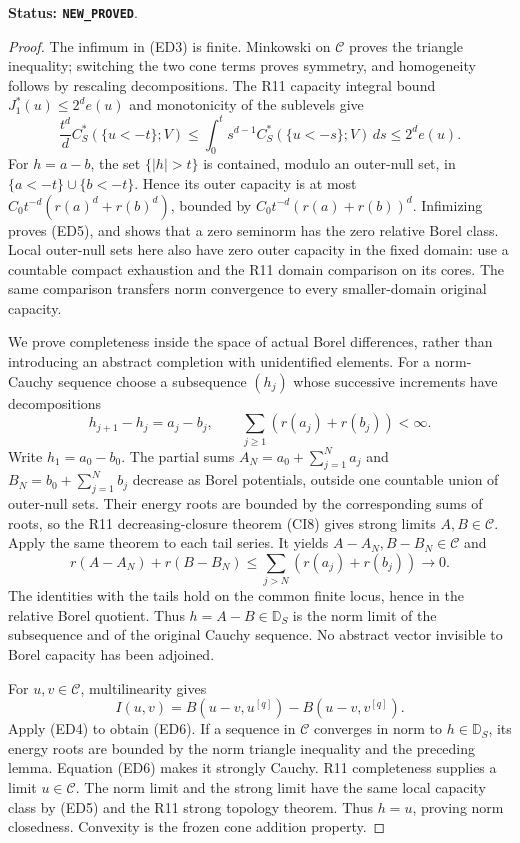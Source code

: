 \noindent\textbf{Status: \texttt{NEW\_PROVED}}.

\begin{proof}
The infimum in (ED3) is finite. Minkowski on $\mathscr C$ proves
the triangle inequality; switching the two cone terms proves
symmetry, and homogeneity follows by rescaling decompositions.
The R11 capacity integral bound $J_1^*(u)\leq2^d e(u)$ and
monotonicity of the sublevels give
\[
 \frac{t^d}{d}C_S^*(\{u<-t\};V)
       \leq\int_0^t s^{d-1}C_S^*(\{u<-s\};V)\,ds
       \leq2^d e(u).
\]
For $h=a-b$, the set $\{|h|>t\}$ is contained, modulo an
outer-null set, in $\{a<-t\}\cup\{b<-t\}$. Hence its outer
capacity is at most $C_0t^{-d}(r(a)^d+r(b)^d)$, bounded by
$C_0t^{-d}(r(a)+r(b))^d$. Infimizing proves (ED5), and shows
that a zero seminorm has the zero relative Borel class. Local
outer-null sets here also have zero outer capacity in the fixed
domain: use a countable compact exhaustion and the R11 domain
comparison on its cores. The same comparison transfers norm
convergence to every smaller-domain original capacity.

We prove completeness inside the space of actual Borel differences,
rather than introducing an abstract completion with unidentified
elements. For a norm-Cauchy sequence choose a subsequence $(h_j)$
whose successive increments have decompositions
\[
 h_{j+1}-h_j=a_j-b_j,\qquad
 \sum_{j\geq1}(r(a_j)+r(b_j))<\infty.
 \tag{ED7}
\]
Write $h_1=a_0-b_0$. The partial sums
$A_N=a_0+\sum_{j=1}^N a_j$ and
$B_N=b_0+\sum_{j=1}^N b_j$ decrease as Borel potentials,
outside one countable union of outer-null sets. Their energy
roots are bounded by the corresponding sums of roots, so the
R11 decreasing-closure theorem (CI8) gives strong limits
$A,B\in\mathscr C$. Apply the same theorem to each tail series.
It yields $A-A_N,B-B_N\in\mathscr C$ and
\[
 r(A-A_N)+r(B-B_N)
          \leq\sum_{j>N}(r(a_j)+r(b_j))\longrightarrow0.
 \tag{ED8}
\]
The identities with the tails hold on the common finite locus,
hence in the relative Borel quotient. Thus $h=A-B\in\mathbb D_S$
is the norm limit of the subsequence and of the original Cauchy
sequence. No abstract vector invisible to Borel capacity has been
adjoined.

For $u,v\in\mathscr C$, multilinearity gives
\[
 I(u,v)=B(u-v,u^{[q]})-B(u-v,v^{[q]}).
\]
Apply (ED4) to obtain (ED6). If a sequence in $\mathscr C$
converges in norm to $h\in\mathbb D_S$, its energy roots are
bounded by the norm triangle inequality and the preceding lemma.
Equation (ED6) makes it strongly Cauchy. R11 completeness supplies
a limit $u\in\mathscr C$. The norm limit and the strong limit
have the same local capacity class by (ED5) and the R11 strong
topology theorem. Thus $h=u$, proving norm closedness.
Convexity is the frozen cone addition property.
\end{proof}

